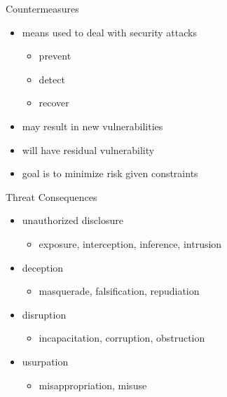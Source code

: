 \documentclass{beamer}
\begin{document}
\begin{frame}{Countermeasures}
  
  \begin{itemize}
    \item means used to deal with security attacks 
      
      \begin{itemize}
        \item prevent 
        \item detect 
        \item recover 
      \end{itemize}
    \item may result in new vulnerabilities 
    \item will have residual vulnerability 
    \item goal is to minimize risk given constraints
  \end{itemize}
\end{frame}


\begin{frame}{Threat Consequences}
  \begin{itemize}
    \item unauthorized disclosure 
      \begin{itemize}
        \item exposure, interception, inference, intrusion 
        \end{itemize}
      \end{itemize}
  \begin{itemize}
    \item deception 
      \begin{itemize}
        \item masquerade, falsification, repudiation 
        \end{itemize}
      \end{itemize}
  \begin{itemize}
    \item disruption 
      \begin{itemize}
        \item incapacitation, corruption, obstruction 
        \end{itemize}
      \end{itemize}
  \begin{itemize}
    \item usurpation 
      \begin{itemize}
      \item misappropriation, misuse
      \end{itemize}
    \end{itemize}
\end{frame}
\end{document}
